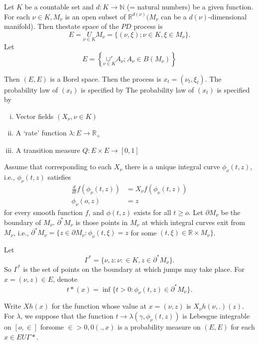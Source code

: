 \medskip
{}

Let $K$ be a countable set and $d: K\to \mathbb{N}$ (= natural numbers)
be a given function. For each $\nu \in K, M_\nu$ is an open subset of
$\mathbb{R}^{d(\nu)}(M_\nu$ can be a $d(\nu)$-dimensional
manifold). Then the\pageoriginale state space of the $PD$ process is  
$$
E = \underset{\nu \in K }{U} M_\nu = \{ (\nu, \xi ) ; \nu \in K, \xi
\in M_\nu\}. 
$$
Let  
$$
E = \left\{\underset{\nu \in K }{\cup'} A_\nu ; A_\nu \in B(M_\nu)\right\}
$$

Then $(E,E)$ is a Borel space. Then the process is $x_t = (\nu_t,
\xi_t)$. The probability law of $(x_t)$ is specified by  
The probability law of $(x_t)$ is specified by 
\begin{enumerate}[(i)]
\item Vector fields $(X_\nu, \nu \in K)$

\item A `rate' function $\lambda: E \to \mathbb{R}_+$

\item A transition measure $Q: E \times E \to [0,1]$
\end{enumerate}
	
Assume that corresponding to each $X_\nu$ there is a unique integral
curve $\phi_\nu (t,z)$, i.e., $\phi_\nu (t,z)$ satisfies  
\begin{align*}
  \frac{d}{dt}f(\phi_\nu (t,z)) & = X_\nu f(\phi_\nu (t,z))\\
  \phi_\nu (o,z)					 & = z
\end{align*}
for every smooth function $f$, and $\phi(t,z)$ exists for all $t \geq
o$. Let $\partial M_\nu$ be the boundary of $M_\nu$. $\partial^\ast
M_\nu$ is those points in $M_\nu$ at which integral curves exit from
$M_\nu$, i.e., $\partial^\ast M_\nu = \{ z \in \partial M_\nu :
\phi_\nu (t, \xi ) = z$  for some $(t, \xi )\in \mathbb{R}
\times M_\nu \}$.   

Let 
$$
\Gamma^* = \{ \nu, z : \nu : \in K, z \in \partial ^* M_\nu\}.
$$
So $\Gamma^*$ is the set of points on the boundary at which jumps may
take place. For $x = (\nu, z) \in E$, denote  
$$
t*(x) = \inf \{ t > 0: \phi_\nu (t,z) \in \partial^\ast M_\nu\}.
$$

Write $Xh(x)$ for the function whose value at $x = (\nu, z)$ is $X_\nu
h (\nu,.)(z)$. For $\lambda$, we suppose that the function $t \to
\lambda (\gamma, \phi_\nu (t,z))$ is Lebesgue integrable on $[o,\in]$
for\pageoriginale some $ \in > 0, 0(.,x)$ is a probability measure on
$(E, E)$ for each $ x \in E U \Gamma*$.   

